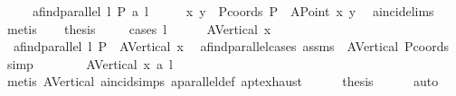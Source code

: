 \begin{isabellebody}
\ \ \ \ \ {\isachardoublequoteopen}{\isacharparenleft}{\kern0pt}a{}find{\isacharunderscore}{\kern0pt}parallel\ l\ P{\isacharparenright}{\kern0pt}\ a{}{\isacharbar}{\kern0pt}{\isacharbar}{\kern0pt}\ l{\isachardoublequoteclose}\isanewline
%
\isadelimproof
%
\endisadelimproof
%
\isatagproof
{}\isamarkupfalse%
\ {\isacharminus}{\kern0pt}\isanewline
\ \ \isamarkupfalse%
\ x{}\ y{}\ \ Pcoords{\isacharcolon}{\kern0pt}\ {\isachardoublequoteopen}P\ {\isacharequal}{\kern0pt}\ {\isacharparenleft}{\kern0pt}A{}Point\ x{}\ y{}{\isacharparenright}{\kern0pt}{\isachardoublequoteclose}\ \isamarkupfalse%
\ a{}incid{\isachardot}{\kern0pt}elims\ \isamarkupfalse%
\ metis\isanewline
\ \ \isamarkupfalse%
\ {\isacharquery}{\kern0pt}thesis\ \isanewline
\ \ \isamarkupfalse%
\ {\isacharparenleft}{\kern0pt}cases\ l{\isacharparenright}{\kern0pt}\isanewline
\ \ \ \ \isamarkupfalse%
\ {\isacharparenleft}{\kern0pt}A{}Vertical\ x{}{\isacharparenright}{\kern0pt}\isanewline
\ \ \ \ \isamarkupfalse%
\ {}{\isacharcolon}{\kern0pt}\ {\isachardoublequoteopen}a{}find{\isacharunderscore}{\kern0pt}parallel\ l\ P\ {\isacharequal}{\kern0pt}\ A{}Vertical\ x{}{\isachardoublequoteclose}\ \isamarkupfalse%
\ a{}find{\isacharunderscore}{\kern0pt}parallel{\isachardot}{\kern0pt}cases\ assms\ \ A{}Vertical\ Pcoords\ \isamarkupfalse%
\ simp\ \isanewline
\ \ \ \ \isamarkupfalse%
\ {}{\isacharcolon}{\kern0pt}\ {\isachardoublequoteopen}A{}Vertical\ x{}\ a{}{\isacharbar}{\kern0pt}{\isacharbar}{\kern0pt}\ l{\isachardoublequoteclose}\ \ \isamarkupfalse%
\ {\isacharparenleft}{\kern0pt}metis\ A{}Vertical\ a{}incid{\isachardot}{\kern0pt}simps{\isacharparenleft}{\kern0pt}{}{\isacharparenright}{\kern0pt}\ a{}parallel{\isacharunderscore}{\kern0pt}def\ a{}pt{\isachardot}{\kern0pt}exhaust{\isacharparenright}{\kern0pt}\isanewline
\ \ \ \ \isamarkupfalse%
\ {\isacharquery}{\kern0pt}thesis\ \isamarkupfalse%
\ {}\ {}\ \isamarkupfalse%
\ auto\isanewline
\ \ \isamarkupfalse%

\end{isabellebody}
